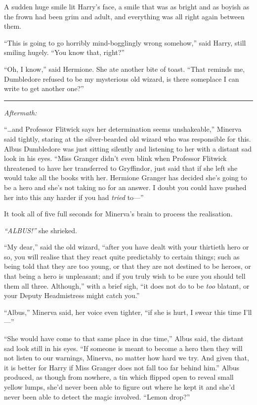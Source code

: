 A sudden huge smile lit Harry's face, a smile that was as bright and as
boyish as the frown had been grim and adult, and everything was all
right again between them.

``This is going to go horribly mind-bogglingly wrong somehow,'' said
Harry, still smiling hugely. ``You know that, right?''

``Oh, I know,'' said Hermione. She ate another bite of toast. ``That
reminds me, Dumbledore refused to be my mysterious old wizard, is there
someplace I can write to get another one?''

\begin{center}\rule{3in}{0.4pt}\end{center}

\emph{Aftermath:}

``\ldots{}and Professor Flitwick says her determination seems
unshakeable,'' Minerva said tightly, staring at the silver-bearded old
wizard who was responsible for this. Albus Dumbledore was just sitting
silently and listening to her with a distant sad look in his eyes.
``Miss Granger didn't even blink when Professor Flitwick threatened to
have her transferred to Gryffindor, just said that if she left she would
take all the books with her. Hermione Granger has decided she's going to
be a hero and she's not taking no for an answer. I doubt you could have
pushed her into this any harder if you had \emph{tried} to---''

It took all of five full seconds for Minerva's brain to process the
realisation.

\emph{``ALBUS!''} she shrieked.

``My dear,'' said the old wizard, ``after you have dealt with your
thirtieth hero or so, you will realise that they react quite predictably
to certain things; such as being told that they are too young, or that
they are not destined to be heroes, or that being a hero is unpleasant;
and if you truly wish to be sure you should tell them all three.
Although,'' with a brief sigh, ``it does not do to be \emph{too}
blatant, or your Deputy Headmistress might catch you.''

``Albus,'' Minerva said, her voice even tighter, ``if she is hurt, I
swear this time I'll---''

``She would have come to that same place in due time,'' Albus said, the
distant sad look still in his eyes. ``If someone is meant to become a
hero then they will not listen to our warnings, Minerva, no matter how
hard we try. And given that, it is better for Harry if Miss Granger does
not fall too far behind him.'' Albus produced, as though from nowhere, a
tin which flipped open to reveal small yellow lumps, she'd never been
able to figure out where he kept it and she'd never been able to detect
the magic involved. ``Lemon drop?''

